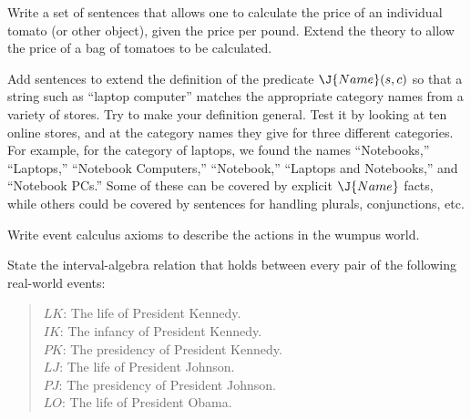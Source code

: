 \begin{iexercise}
Write a set of sentences that allows one to calculate the price of an
individual tomato (or other object), given the price per pound. Extend
the theory to allow the price of a bag of tomatoes to be calculated.
\end{iexercise} 

\begin{exercise}
Add sentences to extend the definition of the predicate \(\J{Name}(s, c)\) so that a string such
as ``laptop computer'' matches the appropriate category names
from a variety of stores.  Try to make your definition general.  Test
it by looking at ten online stores, and at the category names they
give for three different categories.  For example, for the category of
laptops, we found the names ``Notebooks,'' ``Laptops,'' ``Notebook
Computers,'' ``Notebook,'' ``Laptops and Notebooks,'' and ``Notebook
PCs.''  Some of these can be covered by explicit \(\J{Name}\) facts,
while others could be covered by sentences for handling plurals, conjunctions, etc.
\end{exercise} 



\begin{exercise}
Write event calculus axioms to describe the actions in the
wumpus world.  
\end{exercise} 

\begin{exercise}
State the interval-algebra relation that holds between every pair of the 
following real-world events:
\begin{quote}
$LK$: The life of President Kennedy. \\
$IK$: The infancy of President Kennedy. \\
$PK$: The presidency of President Kennedy. \\
$LJ$: The life of President Johnson. \\
$PJ$: The presidency of President Johnson. \\
$LO$: The life of President Obama.
\end{quote}
\end{exercise} 

